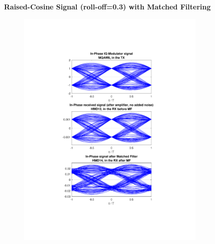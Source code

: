 \begin{refsection}
\begin{figure}[H]
		\centering
	\textbf{Raised-Cosine Signal (roll-off=0.3) with Matched Filtering}
	\begin{minipage}{\linewidth}
		\centering
	\begin{subfigure}{.45\textwidth}
		\centering
		\includegraphics[clip, trim=4cm 4cm 4cm 4cm,
			width=\textwidth]{./sdf/m_qam_system/figures/eyes/simulRc03Sp60Np00_i.pdf}
	\end{subfigure}
	\begin{subfigure}{.45\textwidth}
		\centering

\end{subfigure}
\end{minipage}
\end{figure}
\end{refsection}

